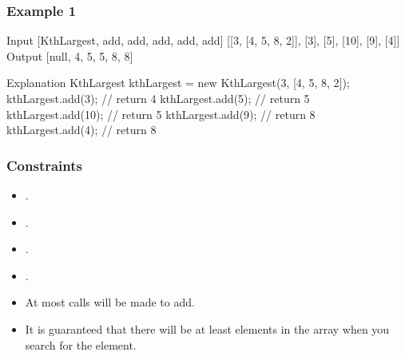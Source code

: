 \documentclass[letterpaper,12pt,english]{book}
\begin{document}
\subsubsection{Example 1}
\label{\detokenize{Priority_Queue/703_Kth_Largest_Element_in_a_Stream:example-1}}
\begin{sphinxVerbatim}[commandchars=\\\{\}]
Input
[\PYGZdq{}KthLargest\PYGZdq{}, \PYGZdq{}add\PYGZdq{}, \PYGZdq{}add\PYGZdq{}, \PYGZdq{}add\PYGZdq{}, \PYGZdq{}add\PYGZdq{}, \PYGZdq{}add\PYGZdq{}]
[[3, [4, 5, 8, 2]], [3], [5], [10], [9], [4]]
Output
[null, 4, 5, 5, 8, 8]

Explanation
KthLargest kthLargest = new KthLargest(3, [4, 5, 8, 2]);
kthLargest.add(3);   // return 4
kthLargest.add(5);   // return 5
kthLargest.add(10);  // return 5
kthLargest.add(9);   // return 8
kthLargest.add(4);   // return 8
\end{sphinxVerbatim}


\subsubsection{Constraints}
\label{\detokenize{Priority_Queue/703_Kth_Largest_Element_in_a_Stream:constraints}}\begin{itemize}
\item {} 
\sphinxAtStartPar
{}.

\item {} 
\sphinxAtStartPar
{}.

\item {} 
\sphinxAtStartPar
{}.

\item {} 
\sphinxAtStartPar
{}.

\item {} 
\sphinxAtStartPar
At most  calls will be made to add.

\item {} 
\sphinxAtStartPar
It is guaranteed that there will be at least  elements in the array when you search for the  element.

\end{itemize}
\end{document}
